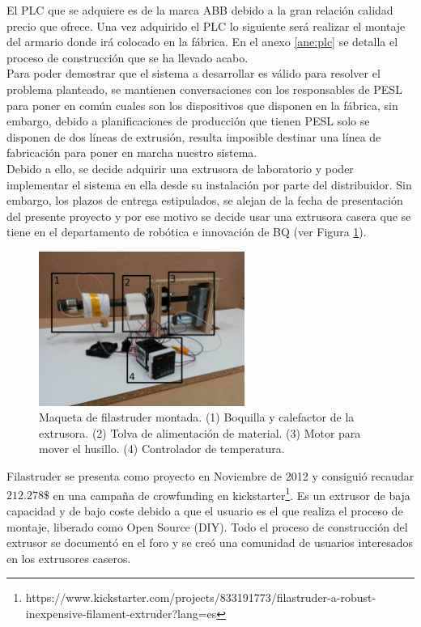 El PLC que se adquiere es de la marca ABB debido a la gran relación calidad precio que ofrece. Una vez adquirido el PLC lo siguiente será realizar el montaje del armario donde irá colocado en la fábrica. En el anexo \ref{ane:plc} se detalla el proceso de construcción que se ha llevado acabo.\\

Para poder demostrar que el sistema a desarrollar es válido para resolver el problema planteado, se mantienen conversaciones con los responsables de PESL para poner en común cuales son los dispositivos que disponen en la fábrica, sin embargo, debido a planificaciones de producción que tienen PESL solo se disponen de dos líneas de extrusión, resulta imposible destinar una línea de fabricación para poner en marcha nuestro sistema.\\

Debido a ello, se decide adquirir una extrusora de laboratorio y poder implementar el sistema en ella desde su instalación por parte del distribuidor. Sin embargo, los plazos de entrega estipulados, se alejan de la fecha de presentación del presente proyecto y por ese motivo se decide usar una extrusora casera que se tiene en el departamento de robótica e innovación de BQ (ver Figura \ref{fig:hardware_filastruder}).

    \begin{figure}[H]
            \centering
            \includegraphics[width=0.6\textwidth]{images/filaextruder/IMG_20150313_11163.jpg}
            \caption[Maqueta de filastruder montada]{Maqueta de filastruder montada. (1) Boquilla y calefactor de la extrusora. (2) Tolva de alimentación de material. (3) Motor para mover el husillo. (4) Controlador de temperatura.}
            \label{fig:hardware_filastruder}
    \end{figure}

Filastruder se presenta como proyecto en Noviembre de 2012 \cite{filastruder} y consiguió recaudar $212.278 \$$ en una campaña de crowfunding en kickstarter\footnote{https://www.kickstarter.com/projects/833191773/filastruder-a-robust-inexpensive-filament-extruder?lang=es}. Es un extrusor de baja capacidad y de bajo coste debido a que el usuario es el que realiza el proceso de montaje, liberado como Open Source (DIY). Todo el proceso de construcción del extrusor se documentó en el foro y se creó una comunidad de usuarios interesados en los extrusores caseros.\\

